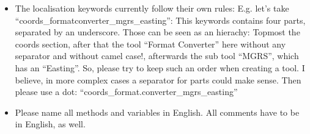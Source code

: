 \begin{itemize}
\item The localisation keywords currently follow their own rules: E.g. let's take \enquote{coords\_formatconverter\_mgrs\_easting}: This keywords contains four parts, separated by an underscore. Those can be seen as an hierachy: Topmost the coords section, after that the tool \enquote{Format Converter} here without any separator and without camel case!, afterwards the sub tool \enquote{MGRS}, which has an \enquote{Easting}. So, please try to keep such an order when creating a tool. I believe, in more complex cases a separator for parts could make sense. Then please use a dot: \enquote{coords\_format.converter\_mgrs\_easting}
\item Please name all methods and variables in English. All comments have to be in English, as well.
\end{itemize}
